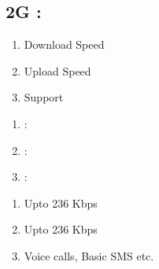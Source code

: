 \documentclass{article}
\newcommand\tab[1][1cm]{\hspace*{#1}}
\begin{document}
\subsection{2G :}
\begin{multicols}{3}
\begin{enumerate}[label= ]
\item \tab Download Speed
\item \tab Upload Speed
\item \tab Support
\end{enumerate}
\columnbreak
\begin{enumerate}[label= ]
\item :
\item :
\item :
\end{enumerate}
\columnbreak
\begin{enumerate}[label= ]
\item Upto 236 Kbps
\item Upto 236 Kbps
\item Voice calls, Basic SMS etc.
\end{enumerate}
\end{multicols}
\vspace{0.02\textheight}
\end{document}

